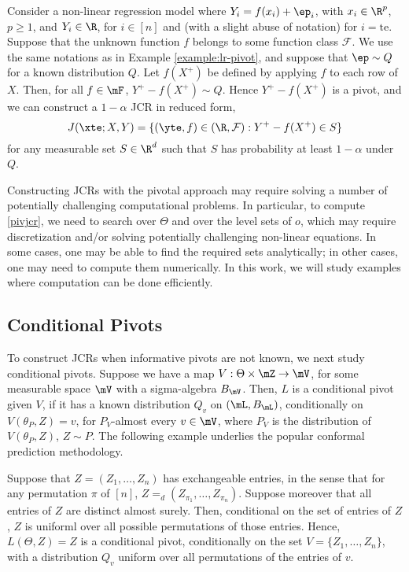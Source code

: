 \documentclass[english]{article}
\begin{document}
\begin{example}\label{example:nonlinear-regression}
Consider
a non-linear regression model 
where
$Y_i = f(x_i) + \ep_i$, 
with $x_i\in \R^{p}$, $p\ge 1$, and $Y_i\in\R$, for $i\in [n]$ and (with a slight abuse of notation) for $i= \mathrm{te}$.
Suppose that the unknown function $f$ belongs to some function class $\mathcal{F}$. 
We use the same notations as in Example \ref{example:lr-pivot}, and
suppose that $\ep\sim Q$ for a known distribution $Q$.
Let $f(X^+)$ be defined by applying $f$ to each row of $X$.
Then, for all $f\in \mF$,
$Y^+ - f(X^+) \sim Q$.
Hence $Y^+ - f(X^+)$ is a pivot, and we can construct a $1-\alpha$ JCR in reduced form,
$$J(\xte;X,Y) = \{(\yte,f) \in (\R,\mathcal{F}):
Y^+ - f(X^+) \in S
\}$$
for any measurable set $S\in \R^d$ such that $S$ has probability at least $1-\alpha$ under $Q$.

\end{example}


Constructing JCRs with the pivotal approach may require solving a number of potentially challenging computational problems. 
In particular, 
to compute \eqref{pivjcr}, 
we need to search over $\Theta$ and over the level sets of $o$, 
which may require discretization and/or solving potentially challenging non-linear equations.
In some cases, one may be able to find the required sets analytically; in other cases, one may need to compute them numerically.
In this work, we will study examples where computation can be done efficiently.



\subsection{Conditional Pivots}\label{sec:conditional-pivot}

To construct JCRs when informative pivots are not known, 
we next study conditional pivots.
Suppose we have a map $V :\Theta\times\mZ\to\mV$, for some measurable space $\mV$
with a sigma-algebra $B_\mV$.
Then, $L$ is a conditional pivot given $V$, if it has a known distribution $Q_v$
on $(\mL,B_\mL)$,
conditionally on $V(\theta_P,Z)=v$, 
for $P_V$-almost every $v\in\mV$, where $P_V$ is the distribution of $V(\theta_P,Z)$, $Z\sim P$.
The following example underlies the popular conformal prediction methodology.

\begin{example}\label{ex}
Suppose that $Z = (Z_1,\ldots,Z_n)$ has exchangeable entries, in the sense that for any permutation $\pi$ of $[n]$, $Z =_d (Z_{\pi_1}, \ldots, Z_{\pi_n})$. 
Suppose moreover that all entries of $Z$ are distinct almost surely. Then, conditional on the set of entries of $Z$, $Z$ is uniforml over all possible permutations of those entries. Hence, $L(\Theta,Z)= Z$ is a conditional pivot, conditionally on the set $V = \{Z_1, \ldots, Z_n\}$, with a distribution $Q_v$ uniform over all permutations of the entries of $v$. 
\end{example}
\end{document}
